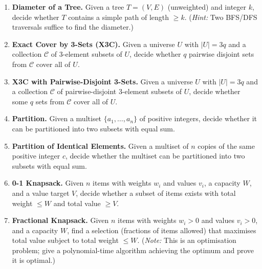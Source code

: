 \documentclass[9pt]{book}
\begin{document}
\begin{enumerate}[label=\arabic*.]
\bigskip

\item \textbf{Diameter of a Tree.}
Given a tree $T=(V,E)$ (unweighted) and integer $k$, decide whether $T$ contains a simple path of length $\geq k$.
(\textit{Hint:} Two BFS/DFS traversals suffice to find the diameter.)

\bigskip

\item \textbf{Exact Cover by 3-Sets (X3C).}
Given a universe $U$ with $|U|=3q$ and a collection $\mathcal{C}$ of 3-element subsets of $U$, decide whether $q$ pairwise disjoint sets from $\mathcal{C}$ cover all of $U$.

\bigskip

\item \textbf{X3C with Pairwise-Disjoint 3-Sets.}
Given a universe $U$ with $|U|=3q$ and a collection $\mathcal{C}$ of pairwise-disjoint 3-element subsets of $U$, decide whether some $q$ sets from $\mathcal{C}$ cover all of $U$.

\bigskip

\item \textbf{Partition.}
Given a multiset $\{a_1,\ldots,a_n\}$ of positive integers, decide whether it can be partitioned into two subsets with equal sum.

\bigskip

\item \textbf{Partition of Identical Elements.}
Given a multiset of $n$ copies of the same positive integer $c$, decide whether the multiset can be partitioned into two subsets with equal sum.

\bigskip

\item \textbf{0-1 Knapsack.}
Given $n$ items with weights $w_i$ and values $v_i$, a capacity $W$, and a value target $V$, decide whether a subset of items exists with total weight $\leq W$ and total value $\geq V$.

\bigskip

\item \textbf{Fractional Knapsack.}
Given $n$ items with weights $w_i>0$ and values $v_i>0$, and a capacity $W$, find a selection (fractions of items allowed) that maximises total value subject to total weight $\leq W$.
(\textit{Note:} This is an optimisation problem; give a polynomial-time algorithm achieving the optimum and prove it is optimal.)

\bigskip


\end{enumerate}
\end{document}
